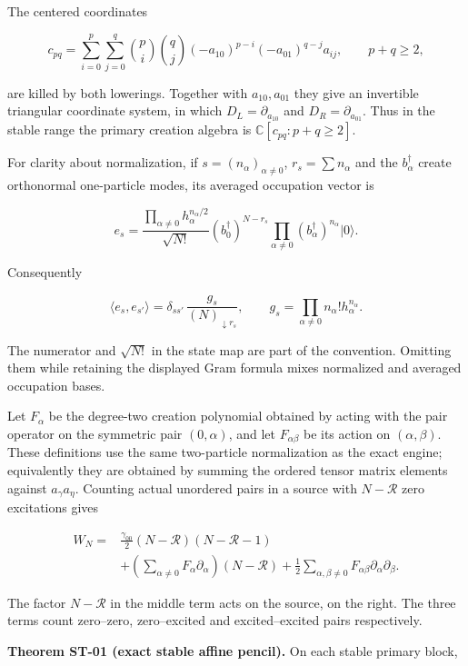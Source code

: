 The centered coordinates

\[
c_{pq}=\sum_{i=0}^{p}\sum_{j=0}^{q}
\binom{p}{i}\binom{q}{j}(-a_{10})^{p-i}(-a_{01})^{q-j}a_{ij},
\qquad p+q\geq2,
\]

are killed by both lowerings. Together with \(a_{10},a_{01}\) they give an invertible triangular coordinate system, in which \(D_L=\partial_{a_{10}}\) and \(D_R=\partial_{a_{01}}\). Thus in the stable range the primary creation algebra is \(\mathbb C[c_{pq}:p+q\geq2]\).

For clarity about normalization, if \(s=(n_\alpha)_{\alpha\ne0}\), \(r_s=\sum n_\alpha\) and the \(b_\alpha^\dagger\) create orthonormal one-particle modes, its averaged occupation vector is

\[
e_s=
\frac{\prod_{\alpha\ne0}h_\alpha^{n_\alpha/2}}{\sqrt{N!}}
(b_0^\dagger)^{N-r_s}
\prod_{\alpha\ne0}(b_\alpha^\dagger)^{n_\alpha}|0\rangle.
\]

Consequently

\[
\langle e_s,e_{s'}\rangle
=\delta_{ss'}\,\frac{g_s}{(N)_{\downarrow r_s}},
\qquad
g_s=\prod_{\alpha\ne0}n_\alpha!h_\alpha^{n_\alpha}.
\]

The numerator and \(\sqrt{N!}\) in the state map are part of the convention. Omitting them while retaining the displayed Gram formula mixes normalized and averaged occupation bases.

Let \(F_\alpha\) be the degree-two creation polynomial obtained by acting with the pair operator on the symmetric pair \((0,\alpha)\), and let \(F_{\alpha\beta}\) be its action on \((\alpha,\beta)\). These definitions use the same two-particle normalization as the exact engine; equivalently they are obtained by summing the ordered tensor matrix elements against \(a_\gamma a_\eta\). Counting actual unordered pairs in a source with \(N-\mathcal R\) zero excitations gives

\[
\begin{aligned}
W_N={}&\frac{\gamma_{00}}2(N-\mathcal R)(N-\mathcal R-1)\\
&+\left(\sum_{\alpha\ne0}F_\alpha\partial_\alpha\right)(N-\mathcal R)
+\frac12\sum_{\alpha,\beta\ne0}
F_{\alpha\beta}\partial_\alpha\partial_\beta.
\end{aligned}
\]

The factor \(N-\mathcal R\) in the middle term acts on the source, on the right. The three terms count zero--zero, zero--excited and excited--excited pairs respectively.

\textbf{Theorem ST-01 (exact stable affine pencil).} On each stable primary block,

